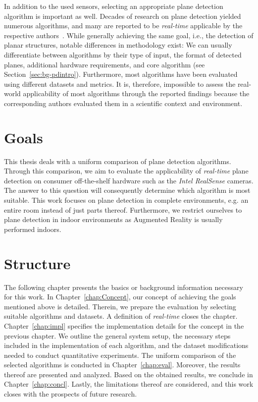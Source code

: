 \documentclass[main.tex]{subfiles}
\begin{document}
In addition to the used sensors, selecting an appropriate plane detection algorithm is important as well.
Decades of research on plane detection yielded numerous algorithms, and many are reported to be \textit{real-time} applicable by the respective authors~\cite{LimbergerOliveira2015HT3D, Roychoudhury_Missura_Bennewitz_2021_new, Xu_Xie_Chen_Wang_2020, 6695732,Feng_Taguchi_Kamat_2014, 7953305}.
While generally achieving the same goal, i.e., the detection of planar structures, notable differences in methodology exist: We can usually differentiate between algorithms by their type of input, the format of detected planes, additional hardware requirements, and core algorithm (see Section~\ref{sec:bg-pdintro}). Furthermore, most algorithms have been evaluated using different datasets and metrics.
It is, therefore, impossible to assess the real-world applicability of most algorithms through the reported findings because the corresponding authors evaluated them in a scientific context and environment.

\section{Goals}
\label{sec:goals}
This thesis deals with a uniform comparison of plane detection algorithms.
Through this comparison, we aim to evaluate the applicability of \textit{real-time} plane detection on consumer off-the-shelf hardware such as the \textit{Intel RealSense} cameras. The answer to this question will consequently determine which algorithm is most suitable.
This work focuses on plane detection in complete environments, e.g. an entire room instead of just parts thereof.
Furthermore, we restrict ourselves to plane detection in indoor environments as Augmented Reality is usually performed indoors.

\section{Structure}
The following chapter presents the basics or background information necessary for this work.
In Chapter~\ref{chap:Concept}, our concept of achieving the goals mentioned above is detailed.
Therein, we prepare the evaluation by selecting suitable algorithms and datasets. A definition of \textit{real-time} closes the chapter.
Chapter~\ref{chap:impl} specifies the implementation details for the concept in the previous chapter. We outline the general system setup, the necessary steps included in the implementation of each algorithm, and the dataset modifications needed to conduct quantitative experiments.
The uniform comparison of the selected algorithms is conducted in Chapter~\ref{chap:eval}. Moreover, the results thereof are presented and analyzed.
Based on the obtained results, we conclude in Chapter~\ref{chap:concl}. Lastly, the limitations thereof are
considered, and this work closes with the prospects of future research.
\end{document}
